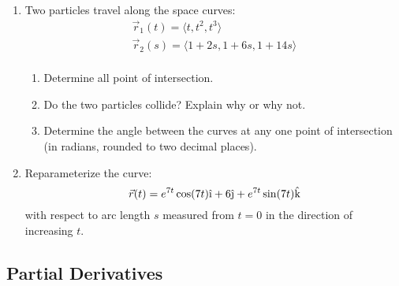 \documentclass[letterpaper,12pt,fleqn]{article}
\newcommand{\uv}[1]{\hat{#1}}
\newcommand{\iv}{\uv{\text{\i}}}
\newcommand{\jv}{\uv{\text{\j}}}
\newcommand{\kv}{\uv{\text{k}}}
\begin{document}
\begin{enumerate}
\item Two particles travel along the space curves:
  \begin{gather*}
    \vec{r}_1(t)=\langle t,t^2,t^3\rangle \\
    \vec{r}_2(s)=\langle 1+2s,1+6s,1+14s\rangle \\
  \end{gather*}
  \begin{enumerate}
  \item Determine all point of intersection.
  \item Do the two particles collide?  Explain why or why not.
  \item Determine the angle between the curves at any one point of intersection (in radians, rounded to two decimal
    places).
  \end{enumerate}

\item Reparameterize the curve:
  \[\vec{r}(t)=e^{7t}\cos(7t)\iv+6\jv+e^{7t}\sin(7t)\kv\]
  with respect to arc length \(s\) measured from \(t=0\) in the direction of increasing \(t\).
\end{enumerate}

\subsection*{Partial Derivatives}
\end{document}
